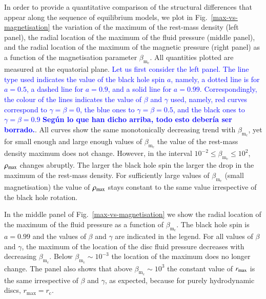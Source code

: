 \documentclass{aa}
\newcommand{\sg}[1]{\textcolor{blue}{#1}}
\begin{document}
In order to provide a quantitative comparison of the structural differences that appear along the sequence of equilibrium models, we plot in Fig.~\ref{max-vs-magnetisation} the variation of the maximum of the rest-mass density (left panel), the radial location of the maximum of the fluid pressure (middle panel), and the radial location of the maximum of the magnetic pressure (right panel) as a function of the magnetisation parameter $\beta_{\mathrm{m}_{\mathrm{c}}}$. All quantities plotted are measured at the equatorial plane. \sg{Let us first consider the left panel. The line type used indicates the value of the black hole spin $a$, namely, a dotted line is for $a=0.5$, a dashed line for $a=0.9$, and a solid line for $a=0.99$. Correspondingly, the colour of the lines indicates the value of $\beta$ and $\gamma$ used, namely, red curves correspond to $\gamma=\beta=0$, the blue ones to $\gamma=\beta=0.5$, and the black ones to $\gamma=\beta=0.9$ \bf{Seg\'un lo que han dicho arriba, todo esto deber\'ia ser borrado.}}. All curves show the same monotonically decreasing trend with $\beta_{\mathrm{m}_{\mathrm{c}}}$, yet for small enough and large enough values of $\beta_{\mathrm{m}_{\mathrm{c}}} $ the value of the rest-mass density maximum does not change. However, in the interval $10^{-2}\le \beta_{\mathrm{m}_{\mathrm{c}}} \le 10^{2}$, $\rho_{\rm max}$ changes abruptly. The larger the black hole spin the larger the drop in the maximum of the rest-mass density. For sufficiently large values of $\beta_{\mathrm{m}_{\mathrm{c}}}$ (small magnetisation) the value of $\rho_{\rm max}$ stays constant to the same value irrespective of the black hole rotation.

In the middle panel of Fig.~\ref{max-vs-magnetisation} we show the radial location of the maximum of the fluid pressure as a function of $\beta_{\mathrm{m}_{\mathrm{c}}}$. The black hole spin is $a=0.99$ and the values of $\beta$ and $\gamma$ are indicated in the legend. For all values of $\beta$ and $\gamma$, the maximum of the location of the disc fluid pressure decreases with decreasing $\beta_{\mathrm{m}_{\mathrm{c}}}$. Below $\beta_{\mathrm{m}_{\mathrm{c}}}\sim 10^{-3}$ the location of the maximum does no longer change. The panel also shows that above $\beta_{\mathrm{m}_{\mathrm{c}}}\sim 10^{3}$ the constant value of $r_{\rm max}$ is the same irrespective of $\beta$ and $\gamma$, as expected, because for purely hydrodynamic discs, $r_{\mathrm{max}} = r_{\mathrm{c}}$.
\end{document}
